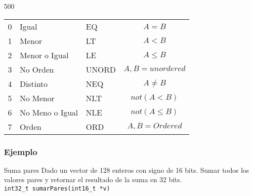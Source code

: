 \documentclass[aspectratio=169]{beamer}
\begin{document}
\begin{frame}[fragile,t]
\begin{textblock}{500}
\begin{tabular}{l|l|l|c}
    0 & Igual            & EQ    & $A = B$ \\
    1 & Menor            & LT    & $A < B$ \\
    2 & Menor o Igual    & LE    & $A \le B$ \\
    3 & No Orden         & UNORD & $A, B = unordered$ \\
    4 & Distinto         & NEQ   & $A \neq B$ \\
    5 & No Menor         & NLT   & $not(A < B)$ \\
    6 & No Meno o Igual  & NLE   & $not(A \le B)$ \\
    7 & Orden            & ORD   & $A, B = Ordered$ \\
    \end{tabular}
    \end{textblock}
\end{frame}


\begin{frame}[fragile]
    \frametitle{Ejemplo}
    \begin{block}{Suma pares}
    Dado un vector de 128 enteros con signo de 16 bits.
    Sumar todos los valores pares y retornar el resultado de la suma en 32 bits.\\
    \bigskip
    \verb|int32_t sumarPares(int16_t *v)|
    \end{block}
\end{frame}
\end{document}
